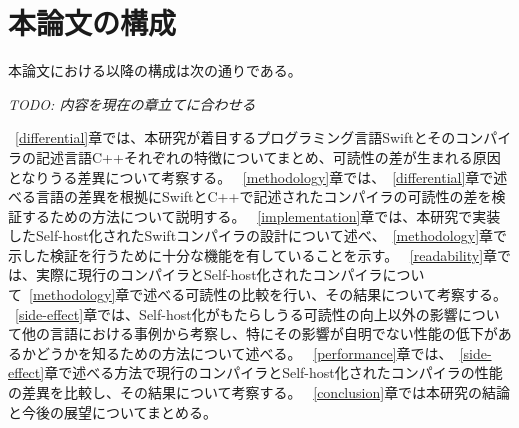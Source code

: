 \section{本論文の構成}

本論文における以降の構成は次の通りである。

\vspace{2em}
{\sl\small{TODO: 内容を現在の章立てに合わせる}}
\vspace{1em}

~\ref{differential}章では、本研究が着目するプログラミング言語Swiftとそのコンパイラの記述言語C++それぞれの特徴についてまとめ、可読性の差が生まれる原因となりうる差異について考察する。
~\ref{methodology}章では、~\ref{differential}章で述べる言語の差異を根拠にSwiftとC++で記述されたコンパイラの可読性の差を検証するための方法について説明する。
~\ref{implementation}章では、本研究で実装したSelf-host化されたSwiftコンパイラの設計について述べ、~\ref{methodology}章で示した検証を行うために十分な機能を有していることを示す。
~\ref{readability}章では、実際に現行のコンパイラとSelf-host化されたコンパイラについて~\ref{methodology}章で述べる可読性の比較を行い、その結果について考察する。
~\ref{side-effect}章では、Self-host化がもたらしうる可読性の向上以外の影響について他の言語における事例から考察し、特にその影響が自明でない性能の低下があるかどうかを知るための方法について述べる。
~\ref{performance}章では、~\ref{side-effect}章で述べる方法で現行のコンパイラとSelf-host化されたコンパイラの性能の差異を比較し、その結果について考察する。
~\ref{conclusion}章では本研究の結論と今後の展望についてまとめる。

